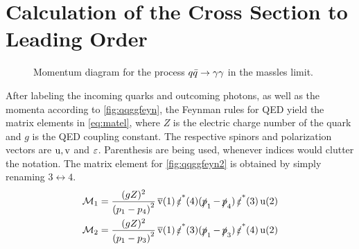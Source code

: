 \section{Calculation of the Cross Section to Leading Order}%
\label{sec:qqggcalc}

\begin{wrapfigure}{R}{0.4\textwidth}
\centering
{}
\caption{\label{fig:qqimpulses} Momentum diagram for the process
  \(q\bar{q}\rightarrow\gamma\gamma\) in the massles limit.}
\end{wrapfigure}
%
After labeling the incoming quarks and outcoming photons, as well as
the momenta according to \cref{fig:qqggfeyn}, the Feynman rules for
QED yield the matrix elements in \cref{eq:matel}, where \(Z\) is the
electric charge number of the quark and \(g\) is the QED coupling
constant. The respective spinors and polarization vectors are
\(\operatorname{u},\operatorname{v}\) and \(\operatorname{\varepsilon}\). Parenthesis are being used, whenever indices
would clutter the notation. The matrix element for
\cref{fig:qqggfeyn2} is obtained by simply renaming
\(3\leftrightarrow 4\).
%
\begin{align}
  \label{eq:matel}
  \mathcal{M}_1 &= \frac{(gZ)^2}{\qty(p_1 - p_4)^2}\vsb(1)\pses(4)(\ps_1 -
                \ps_4)\pses(3)\us(2)\\
  \mathcal{M}_2 &= \frac{(gZ)^2}{\qty(p_1 - p_3)^2}\vsb(1)\pses(3)(\ps_1 - \ps_3)\pses(4)\us(2)
\end{align}
%
